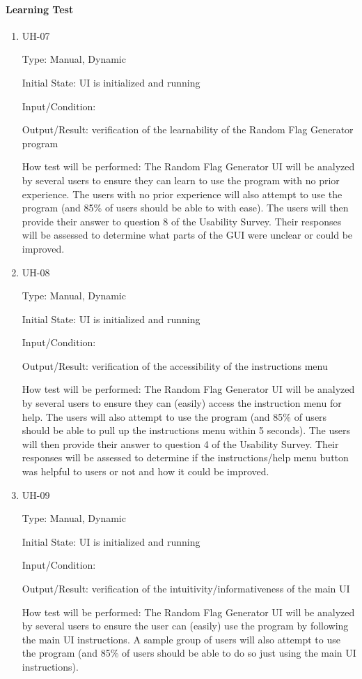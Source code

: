 \documentclass[12pt, titlepage]{article}
\begin{document}
\paragraph{Learning Test}

\begin{enumerate}

\item{UH-07\\}

Type: Manual, Dynamic

Initial State: UI is initialized and running

Input/Condition: 

Output/Result: verification of the learnability of the Random Flag Generator
program

How test will be performed: The Random Flag Generator UI will be analyzed by
several users to ensure they can learn to use the program with no prior
experience. The users with no prior experience will also attempt to use the
program (and 85\% of users should be able to with ease). The users will then
provide their answer to question 8 of the Usability Survey. Their responses
will be assessed to determine what parts of the GUI were unclear or could be
improved.

\item{UH-08\\}

Type: Manual, Dynamic

Initial State: UI is initialized and running

Input/Condition: 

Output/Result: verification of the accessibility of the instructions menu

How test will be performed: The Random Flag Generator UI will be analyzed by
several users to ensure they can (easily) access the instruction menu for
help. The users will also attempt to use the program (and 85\% of users
should be able to pull up the instructions menu within 5 seconds). The users
will then provide their answer to question 4 of the Usability Survey. Their
responses will be assessed to determine if the instructions/help menu button
was helpful to users or not and how it could be improved.

\item{UH-09\\}

Type: Manual, Dynamic

Initial State: UI is initialized and running

Input/Condition: 

Output/Result: verification of the intuitivity/informativeness of the main UI

How test will be performed: The Random Flag Generator UI will be analyzed by
several users to ensure the user can (easily) use the program by following the
main UI instructions. A sample group of users will also attempt to use the
program (and 85\% of users should be able to do so just using the main UI
instructions).

\end{enumerate}
\end{document}
